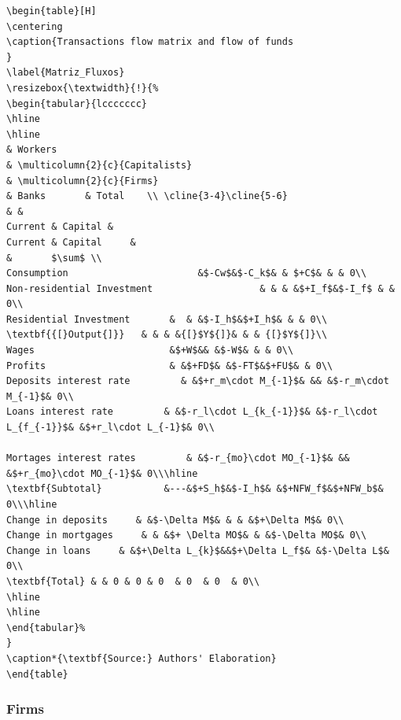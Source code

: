 \documentclass[12pt]{article}
\begin{document}
\begin{verbatim}
\begin{table}[H]
\centering
\caption{Transactions flow matrix and flow of funds
}
\label{Matriz_Fluxos}
\resizebox{\textwidth}{!}{%
\begin{tabular}{lccccccc}
\hline
\hline
& Workers
& \multicolumn{2}{c}{Capitalists}
& \multicolumn{2}{c}{Firms}                        
& Banks       & Total    \\ \cline{3-4}\cline{5-6}
& &
Current & Capital & 
Current & Capital     & 
&       $\sum$ \\ 
Consumption                       &$-Cw$&$-C_k$& & $+C$& & & 0\\
Non-residential Investment                   & & & &$+I_f$&$-I_f$ & & 0\\
Residential Investment       &  & &$-I_h$&$+I_h$& & & 0\\
\textbf{{[}Output{]}}   & & & &{[}$Y${]}& & & {[}$Y${]}\\
Wages                        &$+W$&& &$-W$& & & 0\\
Profits                      & &$+FD$& &$-FT$&$+FU$& & 0\\
Deposits interest rate         & &$+r_m\cdot M_{-1}$& && &$-r_m\cdot M_{-1}$& 0\\
Loans interest rate         & &$-r_l\cdot L_{k_{-1}}$& &$-r_l\cdot L_{f_{-1}}$& &$+r_l\cdot L_{-1}$& 0\\

Mortages interest rates         & &$-r_{mo}\cdot MO_{-1}$& && &$+r_{mo}\cdot MO_{-1}$& 0\\\hline
\textbf{Subtotal}           &---&$+S_h$&$-I_h$& &$+NFW_f$&$+NFW_b$& 0\\\hline
Change in deposits     & &$-\Delta M$& & & &$+\Delta M$& 0\\
Change in mortgages     & & &$+ \Delta MO$& & &$-\Delta MO$& 0\\
Change in loans     & &$+\Delta L_{k}$&&$+\Delta L_f$& &$-\Delta L$& 0\\
\textbf{Total} & & 0 & 0 & 0  & 0  & 0  & 0\\
\hline
\hline
\end{tabular}%
}
\caption*{\textbf{Source:} Authors' Elaboration}
\end{table}
\end{verbatim}


\subsubsection{Firms}
\label{sec:org65e8d48}
\end{document}
